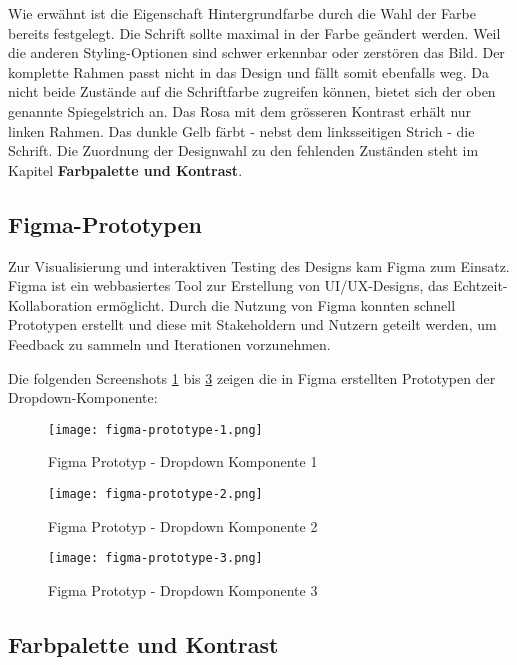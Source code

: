 Wie erwähnt ist die Eigenschaft Hintergrundfarbe durch die Wahl der Farbe bereits festgelegt. 
Die Schrift sollte maximal in der Farbe geändert werden. 
Weil die anderen Styling-Optionen sind schwer erkennbar oder zerstören das Bild.
Der komplette Rahmen passt nicht in das Design und fällt somit ebenfalls weg.
Da nicht beide Zustände auf die Schriftfarbe zugreifen können, bietet sich der oben genannte Spiegelstrich an.
Das Rosa mit dem grösseren Kontrast erhält nur linken Rahmen.
Das dunkle Gelb färbt - nebst dem linksseitigen Strich - die Schrift.
Die Zuordnung der Designwahl zu den fehlenden Zuständen steht im Kapitel \textbf{Farbpalette und Kontrast}.


\clearpage
\subsection{Figma-Prototypen}
\label{sec:figmaPrototype}

Zur Visualisierung und interaktiven Testing des Designs kam Figma zum Einsatz. 
Figma ist ein webbasiertes Tool zur Erstellung von UI/UX-Designs, das Echtzeit-Kollaboration ermöglicht. 
Durch die Nutzung von Figma konnten schnell Prototypen erstellt und diese mit Stakeholdern und Nutzern geteilt werden, um Feedback zu sammeln und Iterationen vorzunehmen.

Die folgenden Screenshots \ref{img:figmaPrototype1} bis \ref{img:figmaPrototype3} zeigen die in Figma erstellten Prototypen der Dropdown-Komponente:

\begin{figure}[!htb]
    \centering
    \texttt{[image: figma-prototype-1.png]}
    \caption{Figma Prototyp - Dropdown Komponente 1}
    \label{img:figmaPrototype1}
\end{figure}

\begin{figure}[!htb]
    \centering
    \texttt{[image: figma-prototype-2.png]}
    \caption{Figma Prototyp - Dropdown Komponente 2}
    \label{img:figmaPrototype2}
\end{figure}

\begin{figure}[!htb]
    \centering
    \texttt{[image: figma-prototype-3.png]}
    \caption{Figma Prototyp - Dropdown Komponente 3}
    \label{img:figmaPrototype3}
\end{figure}


\subsection{Farbpalette und Kontrast}
\label{sec:colorContrast}

